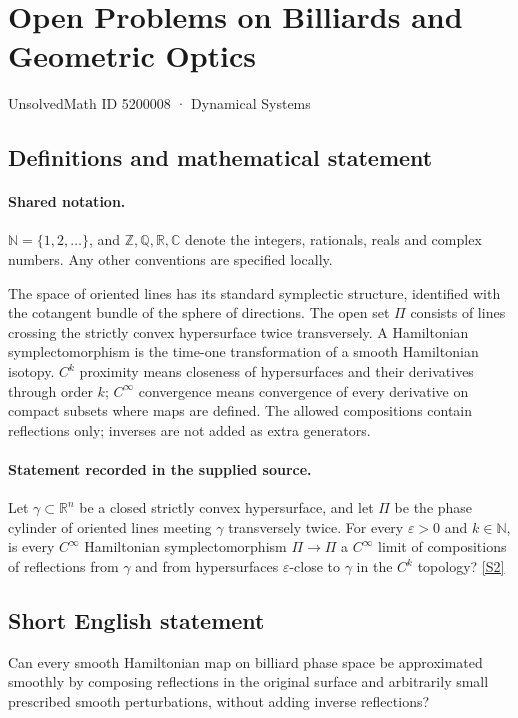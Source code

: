 \documentclass[11pt]{article}
\newcommand{\sref}[2]{\hyperlink{source:#1:#2}{[S#2]}}
\begin{document}
\setcounter{section}{5200007}
\section{Open Problems on Billiards and Geometric Optics}\label{5200008}
{\small\sffamily UnsolvedMath ID 5200008 · Dynamical Systems}
\subsection{Definitions and mathematical statement}

\paragraph{Shared notation.}$\mathbb N=\{1,2,\ldots\}$, and $\mathbb Z,\mathbb Q,\mathbb R,\mathbb C$ denote the integers, rationals, reals and complex numbers. Any other conventions are specified locally.


The space of oriented lines has its standard symplectic structure, identified with the cotangent bundle of the sphere of directions. The open set $\Pi$ consists of lines crossing the strictly convex hypersurface twice transversely. A Hamiltonian symplectomorphism is the time-one transformation of a smooth Hamiltonian isotopy. $C^k$ proximity means closeness of hypersurfaces and their derivatives through order $k$; $C^\infty$ convergence means convergence of every derivative on compact subsets where maps are defined. The allowed compositions contain reflections only; inverses are not added as extra generators.
\paragraph{Statement recorded in the supplied source.}
Let $\gamma\subset\mathbb{R}^n$ be a closed strictly convex hypersurface, and let $\Pi$ be the phase cylinder of oriented lines meeting $\gamma$ transversely twice. For every $\varepsilon>0$ and $k\in\mathbb{N}$, is every $C^\infty$ Hamiltonian symplectomorphism $\Pi\to\Pi$ a $C^\infty$ limit of compositions of reflections from $\gamma$ and from hypersurfaces $\varepsilon$-close to $\gamma$ in the $C^k$ topology? \sref{5200008}{2}
\subsection{Short English statement}
Can every smooth Hamiltonian map on billiard phase space be approximated smoothly by composing reflections in the original surface and arbitrarily small prescribed smooth perturbations, without adding inverse reflections?
\end{document}
